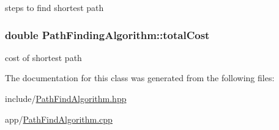 steps to find shortest path 

\hypertarget{classPathFindingAlgorithm_ad6a91f82618d6a7a95900b5c63337837}{
\subsubsection[{total\-Cost}]{\setlength{\rightskip}{0pt plus 5cm}double Path\-Finding\-Algorithm\-::total\-Cost\hspace{0.3cm}{\ttfamily [protected]}}}\label{classPathFindingAlgorithm_ad6a91f82618d6a7a95900b5c63337837}


cost of shortest path 



The documentation for this class was generated from the following files\-:\begin{DoxyCompactItemize}
\item 
include/\hyperlink{PathFindAlgorithm_8hpp}{Path\-Find\-Algorithm.\-hpp}\item 
app/\hyperlink{PathFindAlgorithm_8cpp}{Path\-Find\-Algorithm.\-cpp}\end{DoxyCompactItemize}
